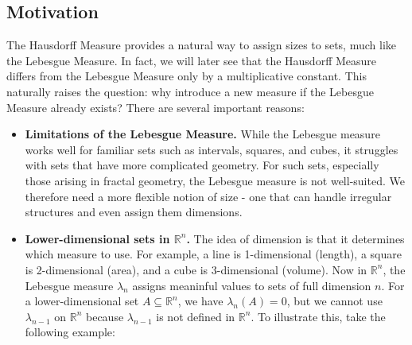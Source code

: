 \documentclass{article}
\theoremstyle{plain}
\theoremstyle{definition}
\theoremstyle{remark}
\begin{document}
\subsection{Motivation}
The Hausdorff Measure provides a natural way to assign sizes to sets, much like the Lebesgue Measure. In fact, we will later see that the Hausdorff Measure differs from the Lebesgue Measure only by a multiplicative constant. This naturally raises the question: why introduce a new measure if the Lebesgue Measure already exists? There are several important reasons:
    \begin{itemize}
        \item \textbf{Limitations of the Lebesgue Measure.} While the Lebesgue measure works well for familiar sets such as intervals, squares, and cubes, it struggles with sets that have more complicated geometry. For such sets, especially those arising in fractal geometry, the Lebesgue measure is not well-suited. We therefore need a more flexible notion of size - one that can handle irregular structures and even assign them dimensions.

        \item \textbf{Lower-dimensional sets in $\mathbb{R}^n$.} The idea of dimension is that it determines which measure to use. For example, a line is 1-dimensional (length), a square is 2-dimensional (area), and a cube is 3-dimensional (volume). Now in $\mathbb{R}^n$, the Lebesgue measure $\lambda _n$ assigns meaninful values to sets of full dimension $n$. For a lower-dimensional set $A\subseteq\mathbb{R}^n$, we have $\lambda_n(A)=0$, but we cannot use $\lambda_{n-1}$ on $\mathbb{R}^n$ because $\lambda _{n-1}$ is not defined in $\mathbb{R}^n$. To illustrate this, take the following example:


                    \begin{center}

                    


\end{center}
\end{itemize}
\end{document}
